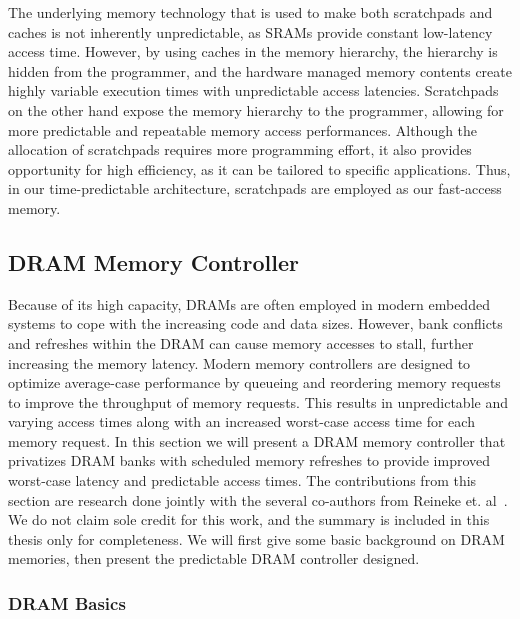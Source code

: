 The underlying memory technology that is used to make both scratchpads and caches is not inherently unpredictable, as SRAMs provide constant low-latency access time. 
However, by using caches in the memory hierarchy, the hierarchy is hidden from the programmer, and the hardware managed memory contents create highly variable execution times with unpredictable access latencies. 
Scratchpads on the other hand expose the memory hierarchy to the programmer, allowing for more predictable and repeatable memory access performances.
Although the allocation of scratchpads requires more programming effort, it also provides opportunity for high efficiency, as it can be tailored to specific applications.   
Thus, in our time-predictable architecture, scratchpads are employed as our fast-access memory. 

\subsection{DRAM Memory Controller}
Because of its high capacity, DRAMs are often employed in modern embedded systems to cope with the increasing code and data sizes.  
However, bank conflicts and refreshes within the DRAM can cause memory accesses to stall, further increasing the memory latency. 
Modern memory controllers are designed to optimize average-case performance by queueing and reordering memory requests to improve the throughput of memory requests. 
This results in unpredictable and varying access times along with an increased worst-case access time for each memory request.
In this section we will present a DRAM memory controller that privatizes DRAM banks with scheduled memory refreshes to provide improved worst-case latency and predictable access times.    
The contributions from this section are research done jointly with the several co-authors from Reineke et. al~\cite{ReinekeLiuPatelKimLee11_PRETDRAMControllerBankPrivatizationForPredictability}. 
We do not claim sole credit for this work, and the summary is included in this thesis only for completeness. 
We will first give some basic background on DRAM memories, then present the predictable DRAM controller designed.

\subsubsection{DRAM Basics}

